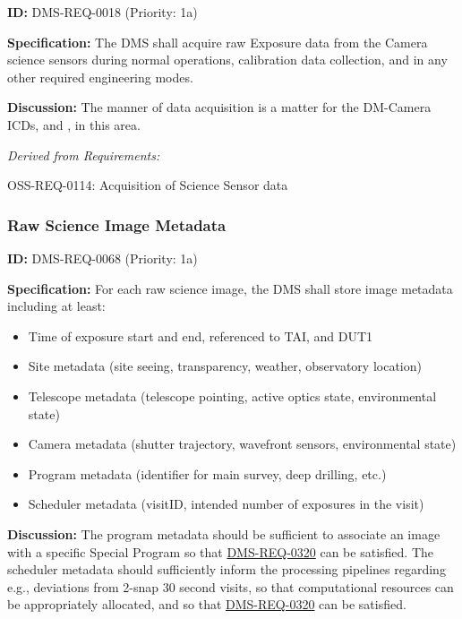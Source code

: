 \documentclass[SE,toc,lsstdraft]{lsstdoc}
\begin{document}
\label{DMS-REQ-0018}
\textbf{ID:} DMS-REQ-0018 (Priority: 1a)

\textbf{Specification:} The DMS shall acquire raw Exposure data from the Camera science sensors during normal operations, calibration data collection, and in any other required engineering modes.

\textbf{Discussion:} The manner of data acquisition is a matter for the DM-Camera ICDs,  and , in this area.

\emph{Derived from Requirements:}

OSS-REQ-0114:
Acquisition of Science Sensor data \newline

\subsubsection{Raw Science Image Metadata}

\label{DMS-REQ-0068}
\textbf{ID:} DMS-REQ-0068 (Priority: 1a)

\textbf{Specification:}
For each raw science image, the DMS shall store image metadata including at least:

    \begin{itemize}
\item
Time of exposure start and end, referenced to TAI, and DUT1

\item
Site metadata (site seeing, transparency, weather, observatory location)

\item
Telescope metadata (telescope pointing, active optics state, environmental state)

\item
Camera metadata (shutter trajectory, wavefront sensors, environmental state)

\item
Program metadata (identifier for main survey, deep drilling, etc.)

\item
Scheduler metadata (visitID, intended number of exposures in the visit)

    \end{itemize}

\textbf{Discussion:}
The program metadata should be sufficient to associate an image with a specific Special Program so that \hyperref[DMS-REQ-0320]{DMS-REQ-0320} can be satisfied. The scheduler metadata should sufficiently inform the processing pipelines regarding e.g., deviations from 2-snap 30 second visits, so that computational resources can be appropriately allocated, and so that \hyperref[DMS-REQ-0320]{DMS-REQ-0320} can be satisfied.
\end{document}
